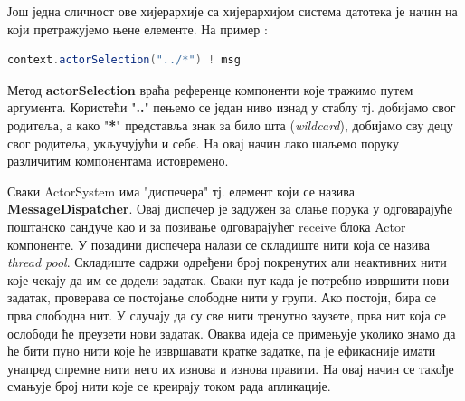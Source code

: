 \documentclass[12pt,oneside]{memoir}
\begin{document}
Још једна сличност ове хијерархије са хијерархијом система датотека је начин на који претражујемо њене елементе. На пример \cite{akkaDoc}:
\begin{lstlisting}[language=Scala]
context.actorSelection("../*") ! msg
\end{lstlisting}
Метод \textbf{actorSelection} враћа референце компоненти које тражимо путем аргумента. Користећи "\textbf{..}" пењемо се један ниво изнад у стаблу тј. добијамо свог родитеља, а како "\textbf{*}" представља знак за било шта (\textit{wildcard}), добијамо сву децу свог родитеља, укључујући и себе. На овај начин лако шаљемо поруку различитим компонентама истовремено.
\\
\par Сваки ActorSystem има "диспечера" тј. елемент који се назива \textbf{MessageDispatcher}. Овај диспечер је задужен за слање порука у одговарајуће поштанско сандуче као и за позивање одговарајућег receive блока Actor компоненте. У позадини диспечера налази се складиште нити која се назива \textit{thread pool}. Складиште садржи одређени број покренутих али неактивних нити које чекају да им се додели задатак. Сваки пут када је потребно извршити нови задатак, проверава се постојање слободне нити у групи. Ако постоји, бира се прва слободна нит. У случају да су све нити тренутно заузете, прва нит која се ослободи ће преузети нови задатак. Оваква идеја се примењује уколико знамо да ће бити пуно нити које ће извршавати кратке задатке, па је ефикасније имати унапред спремне нити него их изнова и изнова правити. На овај начин се такође смањује број нити које се креирају током рада апликације.
\end{document}

